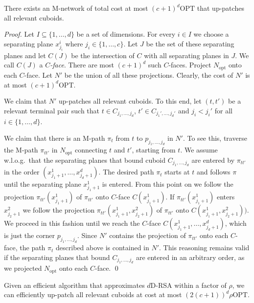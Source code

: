 \documentclass[11pt]{llncs}
\newcommand{\Nopt}{\ensuremath{N_\mathrm{opt}}\xspace}
\newcommand{\opt}{\ensuremath{\mathrm{OPT}}\xspace}
\newenvironment{pf}{\begin{proof}}{\qed\end{proof}}
\begin{document}
\begin{lemma}
  \label{lem:dd-patching-cost}
  There exists an M-network of total cost at most $(c+1)^d\opt$
  that up-patches all relevant cuboids.
\end{lemma}

\begin{pf}
  Let $I\subseteq\{1,\dots,d\}$ be a set of dimensions.  For every
  $i\in I$  we choose a separating plane $x_{j_i}^i$ where
  $j_i\in\{1,\dots,c\}$.  Let $J$ be the set of 
  these separating planes and let $C(J)$ be the intersection of $C$ with
  all separating planes in $J$.  We call $C(J)$ a \emph{$C$-face}.
  There are most $(c+1)^d$ such $C$-faces.  Project $\Nopt$ onto each
  $C$-face.  Let $N'$ be the union of all these
  projections.  Clearly, the cost of $N'$ is at most $(c+1)^d\opt$.

  We claim that $N'$ up-patches all relevant cuboids.  To this end,
  let $(t,t')$ be a relevant terminal pair such that $t\in
  C_{j_1,\dots,j_d}$, $t'\in C_{j_1',\dots,j_d'}$ and $j_i<j_i'$ for
  all $i\in\{1,\dots,d\}$.  

  We claim that there is an M-path $\pi_t$ from $t$ to
  $p_{j_1,\dots,j_d}$ in $N'$.  To see this, traverse the M-path $\pi_{tt'}$ in
  $\Nopt$ connecting $t$ and $t'$, starting from $t$.  We assume
  w.l.o.g.\ that the separating planes that bound cuboid
  $C_{j_1,\dots,j_d}$ are entered by $\pi_{tt'}$ in the order
  $(x_{j_1+1}^1,\dots,x_{j_d+1}^d)$.  The desired path $\pi_t$ starts
  at $t$ and follows $\pi$ until the separating plane $x_{j_1+1}^1$ is
  entered.  From this point on we follow the projection
  $\pi_{tt'}(x_{j_1+1}^1)$ of $\pi_{tt'}$ onto $C$-face
  $C(x_{j_1+1}^1)$.  If $\pi_{tt'}(x_{j_1+1}^1)$ enters $x_{j_2+1}^2$
  we follow the projection $\pi_{tt'}(x_{j_1+1}^1,x_{j_2+1}^2)$ of
  $\pi_{tt'}$ onto $C(x_{j_1+1}^1,x_{j_2+1}^2))$.  We proceed in this
  fashion until we reach the $C$-face 
  $C(x_{j_1+1}^1,\dots,x_{j_d+1}^d)$, which is just the corner
  $p_{j_1,\dots,j_d}$.  Since $N'$ contains the projection of
  $\pi_{tt'}$ onto each $C$-face, the path $\pi_t$ described above is
  contained in $N'$.  This reasoning remains valid if the separating
  planes that bound $C_{j_1,\dots,j_d}$ are entered in an arbitrary
  order, as we projected $\Nopt$ onto each $C$-face.
\end{pf}

\begin{lemma}
  \label{lem:dd-patching-algorithm}
  Given an efficient algorithm that approximates $d$D-RSA within a
  factor of $\rho$, we can efficiently up-patch all relevant cuboids
  at cost at most $(2(c+1))^d \rho\opt$.
\end{lemma}
\end{document}

